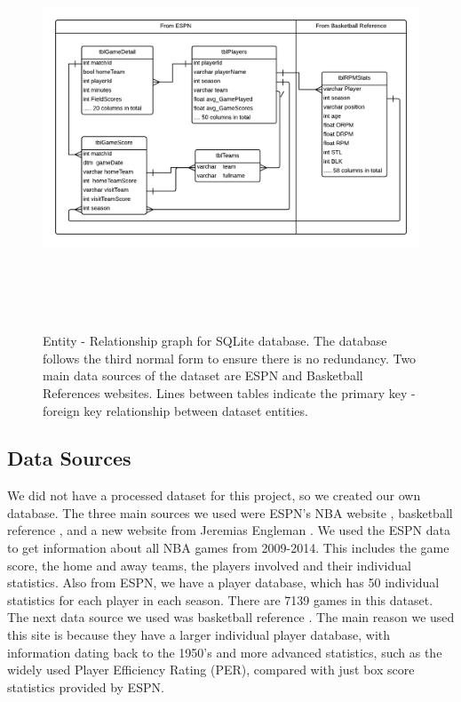 \documentclass{article} %
\begin{document}
\begin{figure}
		\centering
		\includegraphics[width=150mm, height=120mm]{sqliteERDiagram.png}	
		\caption{Entity - Relationship graph for SQLite database. The database follows the third normal form to ensure there is no redundancy. Two main data sources of the dataset are ESPN and Basketball References websites. Lines between tables indicate the primary key - foreign key relationship between dataset entities.}
		\label{fig:database}
\end{figure}

\subsection{Data Sources}
	We did not have a processed dataset for this project, so we created our own database. The three main sources we used were ESPN's NBA website \cite{espn}, basketball reference \cite{bball_ref}, and a new website from Jeremias Engleman \cite{rpm_data}. We used the ESPN data to get information about all NBA games from 2009-2014. This includes the game score, the home and away teams, the players involved and their individual statistics. Also from ESPN, we have a player database, which has 50 individual statistics for each player in each season. There are 7139 games in this dataset. \\

	The next data source we used was basketball reference \cite{bball_ref}. The main reason we used this site is because they have a larger individual player database, with information dating back to the 1950's and more advanced statistics, such as the widely used Player Efficiency Rating (PER), compared with just box score statistics provided by ESPN. \\
\end{document}
